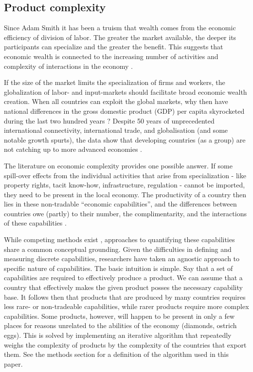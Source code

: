 \documentclass[11pt]{article}
\begin{document}
\subsection{Product complexity}
\label{sec:frame-product-complexity}

Since Adam Smith it has been a truism that wealth comes from the economic efficiency of division of labor. The greater the market available, the deeper its participants can specialize and the greater the benefit. This suggests that economic wealth is connected to the increasing number of activities and complexity of interactions in the economy \citep{romer_endogenous_1990}.

If the size of the market limits the specialization of firms and workers, the globalization of labor- and input-markets should facilitate broad economic wealth creation. When all countries can exploit the global markets, why then have national differences in the gross domestic product (GDP) per capita skyrocketed during the last two hundred years \citep{pritchett_divergence_1997}? Despite 50 years of unprecedented international connectivity, international trade, and globalisation (and some notable growth spurts), the data show that developing countries (as a group) are not catching up to more advanced economies \citep{johnson_what_2020}.

The literature on economic complexity provides one possible answer. If some spill-over effects from the individual activities that arise from  specialization - like property rights, tacit know-how, infrastructure, regulation - cannot be imported, they need to be present in the local economy. The productivity of a country then lies in these non-tradable ``economic capabilities'', and the differences between countries owe (partly) to their number, the complimentarity, and the interactions of these capabilities \citep{hidalgo_product_2007,hausmann_atlas_2013}.

While competing methods exist \citep{tacchella_new_2012,hidalgo_building_2009,inoua_simple_2016}, approaches to quantifying these capabilities share a common conceptual grounding. Given the difficulties in defining and measuring discrete capabilities, researchers have taken an agnostic approach to specific nature of capabilities. The basic intuition is simple. Say that a set of capabilities are required to effectively produce a product. We can assume that a country that effectively makes the given product posses the necessary capability base. It follows then that products that are produced by many countries requires less rare- or non-tradeable capabilities, while rarer products require more complex capabilities. Some products, however, will happen to be present in only a few places for reasons unrelated to the abilities of the economy (diamonds, ostrich eggs). This is solved by implementing an iterative algorithm that repeatedly weighs the complexity of products by the complexity of the countries that export them. See the methods section for a definition of the algorithm used in this paper.
\end{document}
